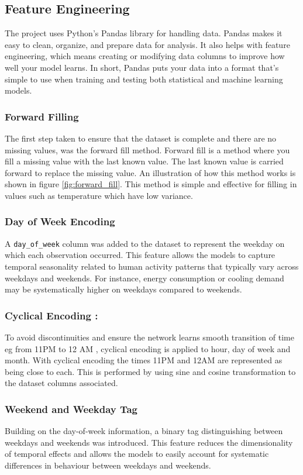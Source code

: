 \subsection{Feature Engineering}
The project uses Python’s Pandas library for handling data. Pandas makes it easy to clean, organize, and prepare data for analysis. It also helps with feature engineering, which means creating or modifying data columns to improve how well your model learns. In short, Pandas puts your data into a format that’s simple to use when training and testing both statistical and machine learning models.

\subsubsection{Forward Filling}
The first step taken to ensure that the dataset is complete and there are no missing values, was the forward fill method. Forward fill is a method where you fill a missing value with the last known value. The last known value is carried forward to replace the missing value. An illustration of how this method works is shown in figure \ref{fig:forward_fill}. This method is simple and effective for filling in values such as temperature which have low variance. 

\subsubsection{Day of Week Encoding}
A \texttt{day\_of\_week} column was added to the dataset to represent the weekday on which each observation occurred. This feature allows the models to capture temporal seasonality related to human activity patterns that typically vary across weekdays and weekends. For instance, energy consumption or cooling demand may be systematically higher on weekdays compared to weekends.
\subsubsection{Cyclical Encoding : } To avoid discontinuities and ensure the network learns smooth transition of time eg from 11PM to 12 AM , cyclical encoding is applied to hour, day of week and month. With cyclical encoding the times 11PM and 12AM are represented as being close to each. This is performed by using sine and cosine transformation to the dataset columns associated.

\subsubsection{Weekend and Weekday Tag}
Building on the day-of-week information, a binary tag distinguishing between weekdays and weekends was introduced. This feature reduces the dimensionality of temporal effects and allows the models to easily account for systematic differences in behaviour between weekdays and weekends.

